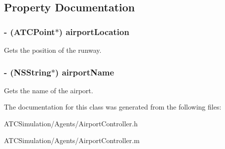 \subsection{\-Property \-Documentation}
\hypertarget{interface_airport_controller_ad6a7fdc0a276639ab840c6e8066069aa}{
\subsubsection[{airport\-Location}]{\setlength{\rightskip}{0pt plus 5cm}-\/ ({\bf \-A\-T\-C\-Point}$\ast$) airport\-Location}}
\label{interface_airport_controller_ad6a7fdc0a276639ab840c6e8066069aa}
\-Gets the position of the runway. \hypertarget{interface_airport_controller_aa5c51181e127f9b4ccbb502d8916b114}{
\subsubsection[{airport\-Name}]{\setlength{\rightskip}{0pt plus 5cm}-\/ (\-N\-S\-String$\ast$) airport\-Name}}
\label{interface_airport_controller_aa5c51181e127f9b4ccbb502d8916b114}
\-Gets the name of the airport. 

\-The documentation for this class was generated from the following files\-:\begin{DoxyCompactItemize}
\item 
\-A\-T\-C\-Simulation/\-Agents/\-Airport\-Controller.\-h\item 
\-A\-T\-C\-Simulation/\-Agents/\-Airport\-Controller.\-m\end{DoxyCompactItemize}
